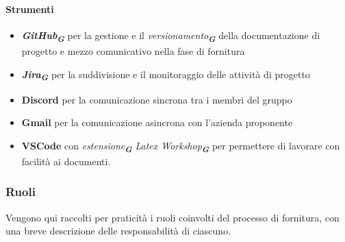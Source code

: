 \documentclass[a4paper,12pt]{article}
\newcommand{\glossario}[1]{\textit{#1}\textsubscript{\textbf{\textit{\textcolor{lightblack}{G}}}}}
\begin{document}
\paragraph{Strumenti}
\begin{itemize}
    \item \glossario{\textbf{GitHub}} per la gestione e il \glossario{versionamento} della documentazione di progetto e mezzo comunicativo nella fase di fornitura
    \item \glossario{\textbf{Jira}} per la suddivisione e il monitoraggio delle attività di progetto
    \item \textbf{Discord} per la comunicazione sincrona tra i membri del gruppo
    \item \textbf{Gmail} per la comunicazione asincrona con l'azienda proponente
    \item \textbf{VSCode} con \glossario{estensione} \glossario{Latex Workshop} per permettere di lavorare con facilità ai documenti.
\end{itemize}

\subsubsection{Ruoli}
Vengono qui raccolti per praticità i ruoli coinvolti del processo di fornitura,
con una breve descrizione delle responsabilità di ciascuno.
\end{document}

